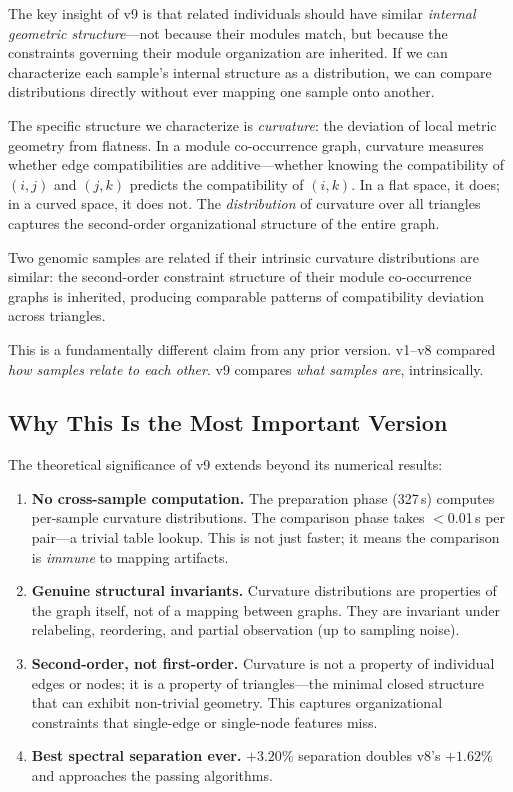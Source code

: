 \documentclass{../yalumba}
\begin{document}
The key insight of v9 is that related individuals should have similar
\emph{internal geometric structure}---not because their modules match, but
because the constraints governing their module organization are inherited.
If we can characterize each sample's internal structure as a distribution,
we can compare distributions directly without ever mapping one sample onto
another.

The specific structure we characterize is \emph{curvature}: the deviation
of local metric geometry from flatness.  In a module co-occurrence graph,
curvature measures whether edge compatibilities are additive---whether
knowing the compatibility of $(i,j)$ and $(j,k)$ predicts the compatibility
of $(i,k)$.  In a flat space, it does; in a curved space, it does not.
The \emph{distribution} of curvature over all triangles captures the
second-order organizational structure of the entire graph.

\begin{definition}
Two genomic samples are related if their intrinsic curvature distributions
are similar: the second-order constraint structure of their module
co-occurrence graphs is inherited, producing comparable patterns of
compatibility deviation across triangles.
\end{definition}

This is a fundamentally different claim from any prior version.  v1--v8
compared \emph{how samples relate to each other}.  v9 compares \emph{what
samples are}, intrinsically.

\subsection{Why This Is the Most Important Version}

The theoretical significance of v9 extends beyond its numerical results:

\begin{enumerate}
  \item \textbf{No cross-sample computation.}  The preparation phase
    (327\,s) computes per-sample curvature distributions.  The comparison
    phase takes $<$0.01\,s per pair---a trivial table lookup.  This is
    not just faster; it means the comparison is \emph{immune} to mapping
    artifacts.
  \item \textbf{Genuine structural invariants.}  Curvature distributions
    are properties of the graph itself, not of a mapping between graphs.
    They are invariant under relabeling, reordering, and partial observation
    (up to sampling noise).
  \item \textbf{Second-order, not first-order.}  Curvature is not a
    property of individual edges or nodes; it is a property of triangles---the
    minimal closed structure that can exhibit non-trivial geometry.  This
    captures organizational constraints that single-edge or single-node
    features miss.
  \item \textbf{Best spectral separation ever.}  $+3.20\%$ separation
    doubles v8's $+1.62\%$ and approaches the passing algorithms.
\end{enumerate}
\end{document}

